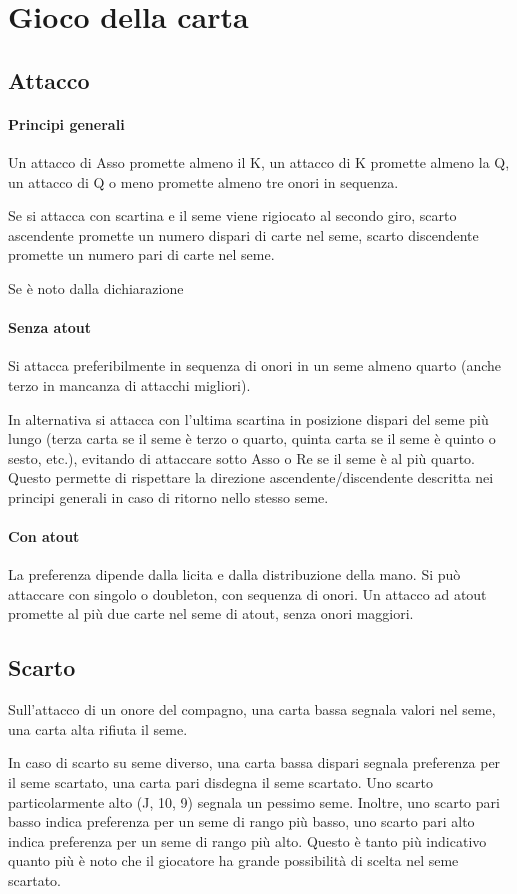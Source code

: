\documentclass[a4paper,10pt]{article}
\begin{document}
\section{Gioco della carta}

\subsection{Attacco}

\paragraph{Principi generali} Un attacco di Asso promette almeno il K, un attacco di K promette almeno la Q, un attacco di Q o meno promette almeno tre onori in sequenza.

Se si attacca con scartina e il seme viene rigiocato al secondo giro, scarto ascendente promette un numero dispari di carte nel seme, scarto discendente promette un numero pari di carte nel seme.

Se è noto dalla dichiarazione

\paragraph{Senza atout} Si attacca preferibilmente in sequenza di onori in un seme almeno quarto (anche terzo in mancanza di attacchi migliori).

In alternativa si attacca con l'ultima scartina in posizione dispari del seme più lungo (terza carta se il seme è terzo o quarto, quinta carta se il seme è quinto o sesto, etc.), evitando di attaccare sotto Asso o Re se il seme è al più quarto. Questo permette di rispettare la direzione ascendente/discendente descritta nei principi generali in caso di ritorno nello stesso seme.

\paragraph{Con atout} La preferenza dipende dalla licita e dalla distribuzione della mano. Si può attaccare con singolo o doubleton, con sequenza di onori. Un attacco ad atout promette al più due carte nel seme di atout, senza onori maggiori.

\subsection{Scarto}

Sull'attacco di un onore del compagno, una carta bassa segnala valori nel seme, una carta alta rifiuta il seme.

In caso di scarto su seme diverso, una carta bassa dispari segnala preferenza per il seme scartato, una carta pari disdegna il seme scartato. Uno scarto particolarmente alto (J, 10, 9) segnala un pessimo seme. Inoltre, uno scarto pari basso indica preferenza per un seme di rango più basso, uno scarto pari alto indica preferenza per un seme di rango più alto. Questo è tanto più indicativo quanto più è noto che il giocatore ha grande possibilità di scelta nel seme scartato.
\end{document}
